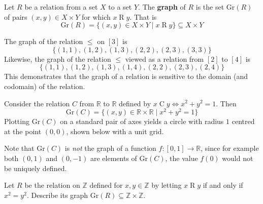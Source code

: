 \begin{definition}
\label{defRelationGraph}
Let $R$ be a relation from a set $X$ to a set $Y$. The \textbf{graph} of $R$ is the set $\mathrm{Gr}(R)$  of pairs $(x,y) \in X \times Y$ for which $x \mathrel{R} y$. That is
\[ \mathrm{Gr}(R) = \{ (x,y) \in X \times Y \mid x \mathrel{R} y \} \subseteq X \times Y \]
\end{definition}

\begin{example}
The graph of the relation $\le$ on $[3]$ is
\[ \{ (1,1), (1,2), (1,3), (2,2), (2,3), (3,3) \} \]
Likewise, the graph of the relation $\le$ viewed as a relation from $[2]$ to $[4]$ is
\[ \{ (1,1), (1,2), (1,3), (1,4), (2,2), (2,3), (2,4) \} \]
This demonstrates that the graph of a relation is sensitive to the domain (and codomain) of the relation.
\end{example}

\begin{example}
\label{exCircleRelation}
Consider the relation $C$ from $\mathbb{R}$ to $\mathbb{R}$ defined by $x \mathrel{C} y \Leftrightarrow x^2+y^2=1$. Then
\[ \mathrm{Gr}(C) = \{ (x,y) \in \mathbb{R} \times \mathbb{R} \mid x^2+y^2=1 \} \]
Plotting $\mathrm{Gr}(C)$ on a standard pair of axes yields a circle with radius $1$ centred at the point $(0,0)$, shown below with a unit grid.
\begin{center}
\end{center}
Note that $\mathrm{Gr}(C)$ is \textit{not} the graph of a function $f : [0,1] \to \mathbb{R}$, since for example both $(0,1)$ and $(0,{-1})$ are elements of $\mathrm{Gr}(C)$, the value $f(0)$ would not be uniquely defined.
\end{example}

\begin{exercise}
Let $R$ be the relation on $\mathbb{Z}$ defined for $x,y \in \mathbb{Z}$ by letting $x \mathrel{R} y$ if and only if $x^2=y^2$. Describe its graph $\mathrm{Gr}(R) \subseteq \mathbb{Z} \times \mathbb{Z}$.
\end{exercise}

